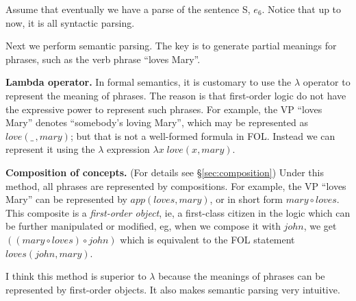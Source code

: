 Assume that eventually we have a parse of the sentence S, $e_6$. Notice that up to now, it is all syntactic parsing.

Next we perform semantic parsing.  The key is to generate partial meanings for phrases, such as the verb phrase ``loves Mary''.

\textbf{Lambda operator.}  In formal semantics, it is customary to use the $\lambda$ operator to represent the meaning of phrases.  The reason is that first-order logic do not have the expressive power to represent such phrases.  For example, the VP ``loves Mary'' denotes ``somebody's loving Mary'', which may be represented as $love(\_ \,,mary)$; but that is not a well-formed formula in FOL.  Instead we can represent it using the $\lambda$ expression $\lambda x \; love(x,mary)$.

\textbf{Composition of concepts.}  (For details see \S\ref{sec:composition})  Under this method, all phrases are represented by compositions.  For example, the VP ``loves Mary'' can be represented by $app(loves,mary)$, or in short form $mary \circ loves$.  This composite is a \textit{first-order object}, ie, a first-class citizen in the logic which can be further manipulated or modified, eg, when we compose it with $john$, we get $((mary \circ loves) \circ john)$ which is equivalent to the FOL statement $loves(john,mary)$.

I think this method is superior to $\lambda$ because the meanings of phrases can be represented by first-order objects.  It also makes semantic parsing very intuitive.



